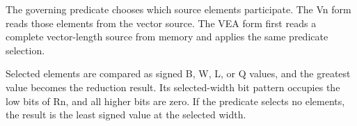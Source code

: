 The governing predicate chooses which source elements participate. The Vn form
reads those elements from the vector source. The VEA form first reads a complete
vector-length source from memory and applies the same predicate selection.

Selected elements are compared as signed B, W, L, or Q values, and the greatest
value becomes the reduction result. Its selected-width bit pattern occupies the
low bits of Rn, and all higher bits are zero. If the predicate selects no
elements, the result is the least signed value at the selected width.
